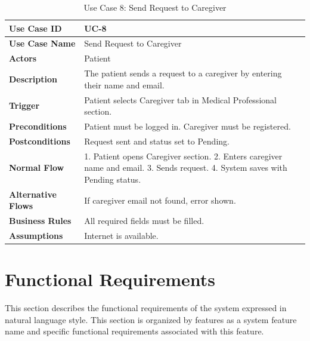 \documentclass[12pt, a4paper, oneside]{report}
\begin{document}
\begin{table}[H]
\centering
\caption{Use Case 8: Send Request to Caregiver}
\begin{tabularx}{\textwidth}{|l|X|}
\hline
\textbf{Use Case ID} & UC-8 \\ \hline
\textbf{Use Case Name} & Send Request to Caregiver \\ \hline
\textbf{Actors} & Patient \\ \hline
\textbf{Description} & The patient sends a request to a caregiver by entering their name and email. \\ \hline
\textbf{Trigger} & Patient selects Caregiver tab in Medical Professional section. \\ \hline
\textbf{Preconditions} & Patient must be logged in. Caregiver must be registered. \\ \hline
\textbf{Postconditions} & Request sent and status set to Pending. \\ \hline
\textbf{Normal Flow} & 1. Patient opens Caregiver section. 2. Enters caregiver name and email. 3. Sends request. 4. System saves with Pending status. \\ \hline
\textbf{Alternative Flows} & If caregiver email not found, error shown. \\ \hline
\textbf{Business Rules} & All required fields must be filled. \\ \hline
\textbf{Assumptions} & Internet is available. \\ \hline
\end{tabularx}
\end{table}



\section{Functional Requirements}
\label{sec:functional-req}

This section describes the functional requirements of the system expressed in natural language style. This section is organized by features as a system feature name and specific functional requirements associated with this feature.

\end{document}
